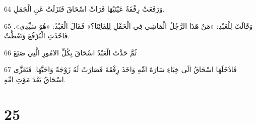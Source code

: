 \par 64 وَرَفَعَتْ رِفْقَةُ عَيْنَيْهَا فَرَاتْ اسْحَاقَ فَنَزَلَتْ عَنِ الْجَمَلِ.
\par 65 وَقَالَتْ لِلْعَبْدِ: «مَنْ هَذَا الرَّجُلُ الْمَاشِي فِي الْحَقْلِ لِلِقَائِنَا؟» فَقَالَ الْعَبْدُ: «هُوَ سَيِّدِي». فَاخَذَتِ الْبُرْقُعَ وَتَغَطَّتْ.
\par 66 ثُمَّ حَدَّثَ الْعَبْدُ اسْحَاقَ بِكُلِّ الامُورِ الَّتِي صَنَعَ
\par 67 فَادْخَلَهَا اسْحَاقُ الَى خِبَاءِ سَارَةَ امِّهِ وَاخَذَ رِفْقَةَ فَصَارَتْ لَهُ زَوْجَةً وَاحَبَّهَا. فَتَعَزَّى اسْحَاقُ بَعْدَ مَوْتِ امِّهِ.

\chapter{25}

